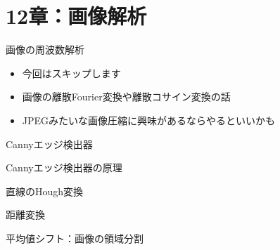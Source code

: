 \documentclass[10pt]{beamer}
\begin{document}
	\section{12章：画像解析}
	
	\begin{frame}{画像の周波数解析}
	    \begin{itemize}
	        \item 今回はスキップします
	        \item 画像の離散Fourier変換や離散コサイン変換の話
	        \item JPEGみたいな画像圧縮に興味があるならやるといいかも
	    \end{itemize}
	\end{frame}
	
	\begin{frame}{Cannyエッジ検出器}
	    
	\end{frame}
	
	\begin{frame}{Cannyエッジ検出器の原理}
	    
	\end{frame}
	
	\begin{frame}{直線のHough変換}
	    
	\end{frame}
	
	\begin{frame}{距離変換}

	\end{frame}
	
	\begin{frame}{平均値シフト：画像の領域分割}
	    
	\end{frame}
	\fi
\end{document}
